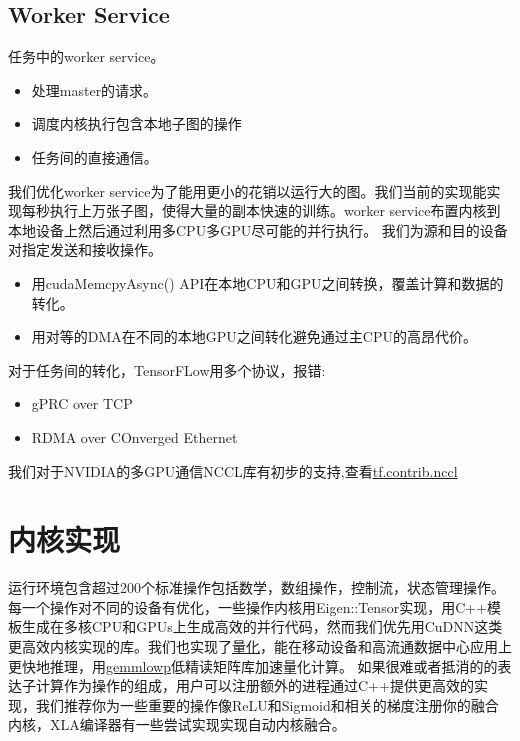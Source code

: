 \documentclass{book}
\begin{document}
\subsection{Worker Service}
任务中的worker service。
\begin{itemize}
\item 处理master的请求。
\item 调度内核执行包含本地子图的操作
\item 任务间的直接通信。
\end{itemize}
我们优化worker service为了能用更小的花销以运行大的图。我们当前的实现能实现每秒执行上万张子图，使得大量的副本快速的训练。worker service布置内核到本地设备上然后通过利用多CPU多GPU尽可能的并行执行。
我们为源和目的设备对指定发送和接收操作。
\begin{itemize}
\item 用cudaMemcpyAsync() API在本地CPU和GPU之间转换，覆盖计算和数据的转化。
\item 用对等的DMA在不同的本地GPU之间转化避免通过主CPU的高昂代价。
\end{itemize}
对于任务间的转化，TensorFLow用多个协议，报错:
\begin{itemize}
\item gPRC over TCP
\item RDMA over COnverged Ethernet
\end{itemize}
我们对于NVIDIA的多GPU通信NCCL库有初步的支持,查看\href{https://www.github.com/tensorflow/tensorflow/blob/r1.4/tensorflow/contrib/nccl/python/ops/nccl_ops.py}{tf.contrib.nccl}
\section{内核实现}
运行环境包含超过200个标准操作包括数学，数组操作，控制流，状态管理操作。每一个操作对不同的设备有优化，一些操作内核用Eigen::Tensor实现，用C++模板生成在多核CPU和GPUs上生成高效的并行代码，然而我们优先用CuDNN这类更高效内核实现的库。我们也实现了\href{https://www.tensorflow.org/performance/quantization}{量化}，能在移动设备和高流通数据中心应用上更快地推理，用\href{https://github.com/google/gemmlowp}{gemmlowp}低精读矩阵库加速量化计算。
如果很难或者抵消的的表达子计算作为操作的组成，用户可以注册额外的进程通过C++提供更高效的实现，我们推荐你为一些重要的操作像ReLU和Sigmoid和相关的梯度注册你的融合内核，XLA编译器有一些尝试实现实现自动内核融合。
\end{document}
